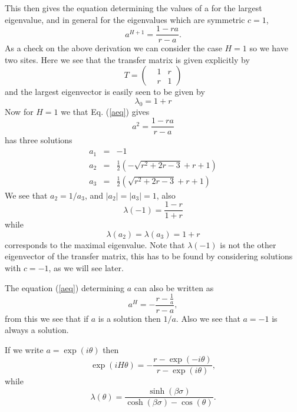 This then gives the equation determining the values of a for the largest eigenvalue, and in general for the eigenvalues which are symmetric $c=1$,
\begin{equation}
    a^{H+1} =  \frac{1-ra}{r-a}.
    \label{aeq}
\end{equation}
As a check on the above derivation we can consider the case $H=1$ so we have two sites. Here we see that the transfer matrix is given explicitly by
\begin{equation}
    T =\begin{pmatrix} & 1 & r\\& r &1\end{pmatrix}
\end{equation}
and the largest eigenvector is easily seen to be given by
\begin{equation}
    \lambda_0 = 1+r 
\end{equation}
Now for $H=1$ we that Eq. (\ref{aeq}) gives
\begin{equation}
    a^{2} =  \frac{1-ra}{r-a}
\end{equation}
has three solutions
\begin{eqnarray}
a_1&=& -1\\
a_2&=& \frac{1}{2} \left(-\sqrt{r^2+2
   r-3}+r+1\right)    \\
a_3&=& \frac{1}{2} \left(\sqrt{r^2+2
   r-3}+r+1\right)\end{eqnarray}
We see that $a_2=1/a_3$, and $|a_2|=|a_3|=1$, also
\begin{equation}
    \lambda(-1)= \frac{1-r}{1+r}
\end{equation}
while 
\begin{equation}
    \lambda(a_2)=\lambda(a_3)= 1+r
\end{equation}
corresponds to the maximal eigenvalue. Note that $\lambda(-1)$ is not the other  eigenvector of the transfer matrix, this has to be found by considering solutions with $c=-1$, as we will see later.

The equation  (\ref{aeq}) determining $a$ can also be written as
\begin{equation}
    a^{H} = - \frac{r-\frac{1}{a}}{r-a},
\end{equation}
from this we see that if $a$ is a solution then $1/a$. Also we see that $a=-1$ is always a solution.

If we write $a=\exp(i\theta)$ then 
\begin{equation}
    \exp(iH\theta) = - \frac{r-\exp(-i\theta)}{r-\exp(i\theta)},\label{thetamas}
\end{equation}
while
\begin{equation}
    \lambda(\theta) = \frac{\sinh(\beta\sigma)}{\cosh(\beta\sigma) - \cos(\theta)}.
\end{equation}

